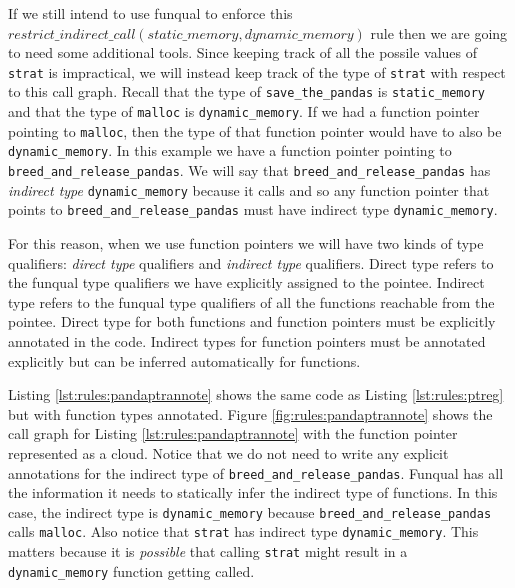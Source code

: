 \begin{sloppypar}
If we still intend to use funqual to enforce this $restrict\_indirect\_call(static\_memory, dynamic\_memory)$ rule then we are going to need some additional tools.  Since keeping track of all the possile values of \lstinline{strat} is impractical, we will instead keep track of the type of \lstinline{strat} with respect to this call graph.  Recall that the type of \lstinline{save_the_pandas} is \lstinline{static_memory} and that the type of \lstinline{malloc} is \lstinline{dynamic_memory}.  If we had a function pointer pointing to \lstinline{malloc}, then the type of that function pointer would have to also be \lstinline{dynamic_memory}.  In this example we have a function pointer pointing to \lstinline{breed_and_release_pandas}.  We will say that \lstinline{breed_and_release_pandas} has \textit{indirect type} \lstinline{dynamic_memory} because it calls  and so any function pointer that points to \lstinline{breed_and_release_pandas} must have indirect type \lstinline{dynamic_memory}.
\end{sloppypar}

For this reason, when we use function pointers we will have two kinds of type qualifiers:  \textit{direct type} qualifiers and \textit{indirect type} qualifiers.  Direct type refers to the funqual type qualifiers we have explicitly assigned to the pointee.  Indirect type refers to the funqual type qualifiers of all the functions reachable from the pointee.  Direct type for both functions and function pointers must be explicitly annotated in the code.  Indirect types for function pointers must be annotated explicitly but can be inferred automatically for functions. 

Listing \ref{lst:rules:pandaptrannote} shows the same code as Listing \ref{lst:rules:ptreg} but with function types annotated.  Figure \ref{fig:rules:pandaptrannote} shows the call graph for Listing \ref{lst:rules:pandaptrannote} with the function pointer represented as a cloud.  Notice that we do not need to write any explicit annotations for the indirect type of \lstinline{breed_and_release_pandas}.  Funqual has all the information it needs to statically infer the indirect type of functions.  In this case, the indirect type is \lstinline{dynamic_memory} because \lstinline{breed_and_release_pandas} calls \lstinline{malloc}.  Also notice that \lstinline{strat} has indirect type \lstinline{dynamic_memory}.  This matters because it is \textit{possible} that calling \lstinline{strat} might result in a \lstinline{dynamic_memory} function getting called.  

